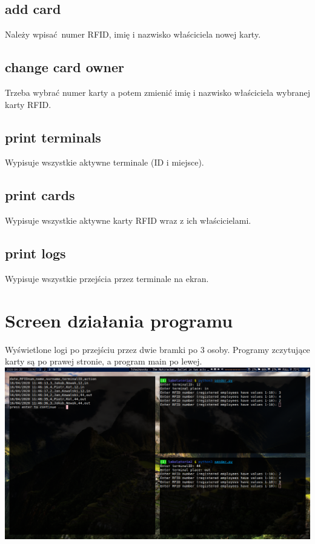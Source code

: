 \documentclass{article}
\begin{document}
\subsection{add card}
Należy wpisać numer RFID, imię i nazwisko właściciela nowej karty.

\subsection{change card owner}
Trzeba wybrać numer karty a potem zmienić  imię i nazwisko 
właściciela wybranej karty RFID.

\subsection{print terminals}
Wypisuje wszystkie aktywne terminale (ID i miejsce).

\subsection{print cards}
Wypisuje wszystkie aktywne karty RFID wraz z ich właścicielami.

\subsection{print logs}
Wypisuje wszystkie przejścia przez terminale na ekran.

\section{Screen działania programu}
Wyświetlone logi po przejściu przez dwie bramki po 3 osoby.
Programy zczytujące karty są po prawej stronie, a program main
po lewej. \\

\begin{adjustbox}{center}
    \includegraphics[scale=0.4]{logs}
\end{adjustbox}
\end{document}
